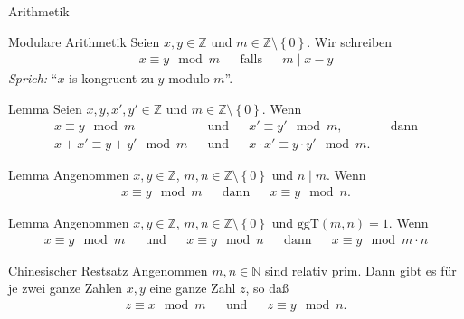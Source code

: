 \documentclass[aspectratio=1610, 11pt]{beamer}
\newcommand\NN{\mathbb N}
\newcommand\ZZ{\mathbb Z}
\newcommand\cbc[1]{\left\{{#1}\right\}}
\newcommand{\ggt}{\mathrm{ggT}}
\begin{document}
\begin{frame}{Arithmetik}
	\begin{overprint}
\begin{exampleblock}{Modulare Arithmetik}
		Seien $x,y\in\ZZ$ und $m\in\ZZ\setminus\cbc 0$.
		Wir schreiben
		\begin{align*}
			x\equiv y\mod m&&\mbox{falls}&&m\mid x-y
		\end{align*}
		\emph{Sprich:} ``$x$ is kongruent zu $y$ modulo $m$''.
	\end{exampleblock}
\begin{block}{Lemma}
	Seien $x,y,x',y'\in\ZZ$ und $m\in\ZZ\setminus\cbc 0$.
	Wenn
	\begin{align*}
		x\equiv y\mod m&&\mbox{und}&&x'\equiv y'\mod m,&&\mbox{dann}\\
		x+x'\equiv y+y'\mod m&&\mbox{und}&&x\cdot x'\equiv y\cdot y'\mod m.
	\end{align*}
\end{block}
\begin{block}{Lemma}
	Angenommen $x,y\in\ZZ$, $m,n\in\ZZ\setminus\cbc 0$ und $n\mid m$.	
	Wenn
	\begin{align*}
		x\equiv y\mod m&&\mbox{dann}&&x\equiv y\mod n.
	\end{align*}
\end{block}
\begin{block}{Lemma}
	Angenommen $x,y\in\ZZ$, $m,n\in\ZZ\setminus\cbc 0$ und $\ggt(m,n)=1$.	
	Wenn
	\begin{align*}
		x\equiv y\mod m&&\mbox{und}&&x\equiv y\mod n&&\mbox{dann}&&x\equiv y\mod m\cdot n
	\end{align*}
\end{block}
\begin{block}{Chinesischer Restsatz}
	Angenommen $m,n\in\NN$ sind relativ prim.
	Dann gibt es f\"ur je zwei ganze Zahlen $x,y$ eine ganze Zahl $z$, so da\ss\
	\begin{align*}
		z\equiv x\mod m&&\mbox{und}&&z\equiv y\mod n.
	\end{align*}
\end{block}
	\end{overprint}
\end{frame}
\end{document}
